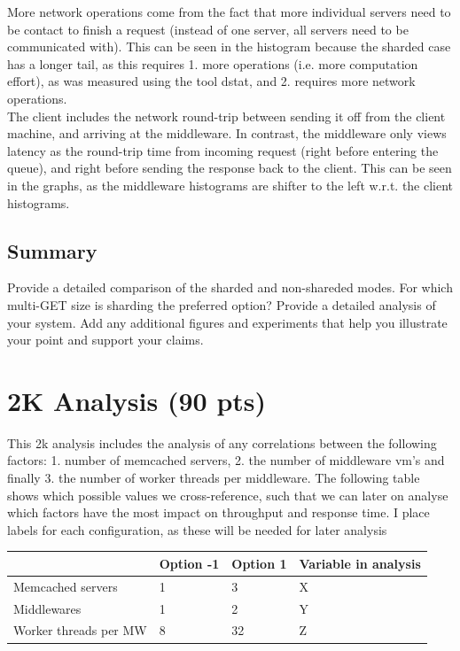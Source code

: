\documentclass[11pt,a4paper]{article}
\begin{document}

More network operations come from the fact that more individual servers need to be contact to finish a request (instead of one server, all servers need to be communicated with).
This can be seen in the histogram because the sharded case has a longer tail, as this requires 1. more operations (i.e. more computation effort), as was measured using the tool dstat, and 2. requires more network operations. \\

The client includes the network round-trip between sending it off from the client machine, and arriving at the middleware.
In contrast, the middleware only views latency as the round-trip time from incoming request (right before entering the queue), and right before sending the response back to the client.
This can be seen in the graphs, as the middleware histograms are shifter to the left w.r.t. the client histograms.


\subsection{Summary}

Provide a detailed comparison of the sharded and non-shareded modes. For which multi-GET size is sharding the preferred option? Provide a detailed analysis of your system. Add any additional figures and experiments that help you illustrate your point and support your claims.

\section{2K Analysis (90 pts)}

This 2k analysis includes the analysis of any correlations between the following factors: 1. number of memcached servers, 2. the number of middleware vm's and finally 3. the number of worker threads per middleware.
The following table shows which possible values we cross-reference, such that we can later on analyse which factors have the most impact on throughput and response time.
I place labels for each configuration, as these will be needed for later analysis

\begin{center}
    \begin{tabular}{ | l | l | l | p{5cm} |}
    \hline
     & Option -1 & Option 1 & Variable in analysis \\ \hline
    Memcached servers & 1 & 3 & X \\ \hline
    Middlewares & 1 & 2 & Y \\ \hline
    Worker threads per MW & 8 & 32 & Z \\
    \hline
    \end{tabular}
\end{center}
\end{document}
